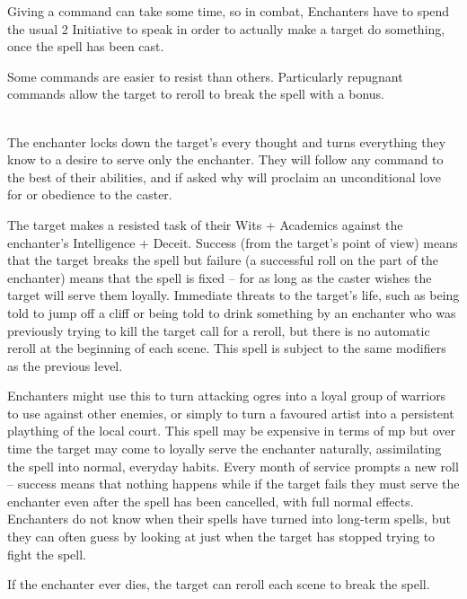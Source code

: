 \begin{multicols}{2}

\noindent
Giving a command can take some time, so in combat, Enchanters have to spend the usual 2 Initiative to speak in order to actually make a target do something, once the spell has been cast.

Some commands are easier to resist than others. Particularly repugnant commands allow the target to reroll to break the spell with a bonus.

\spelllevel

\\
The enchanter locks down the target's every thought and turns everything they know to a desire to serve only the enchanter. They will follow any command to the best of their abilities, and if asked why will proclaim an unconditional love for or obedience to the caster.

The target makes a resisted task of their Wits + Academics against the enchanter's Intelligence + Deceit.
Success (from the target's point of view) means that the target breaks the spell but failure (a successful roll on the part of the enchanter) means that the spell is fixed -- for as long as the caster wishes the target will serve them loyally.
Immediate threats to the target's life, such as being told to jump off a cliff or being told to drink something by an enchanter who was previously trying to kill the target call for a reroll, but there is no automatic reroll at the beginning of each scene.
This spell is subject to the same modifiers as the previous level.

Enchanters might use this to turn attacking ogres into a loyal group of warriors to use against other enemies, or simply to turn a favoured artist into a persistent plaything of the local court. This spell may be expensive in terms of \gls{mp} but over time the target may come to loyally serve the enchanter naturally, assimilating the spell into normal, everyday habits. Every month of service prompts a new roll -- success means that nothing happens while if the target fails they must serve the enchanter even after the spell has been cancelled, with full normal effects. Enchanters do not know when their spells have turned into long-term spells, but they can often guess by looking at just when the target has stopped trying to fight the spell.

If the enchanter ever dies, the target can reroll each scene to break the spell.


\end{multicols}
